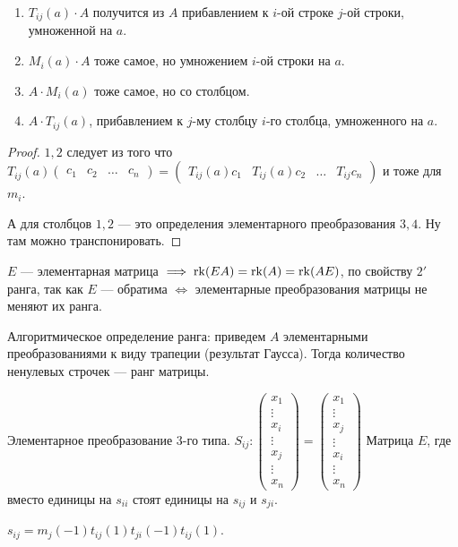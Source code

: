 \begin{statement}
    \begin{enumerate}
        \item $T_{ij}(a) \cdot A$ получится из  $A$ прибавлением к  $i$-ой строке  $j$-ой строки, умноженной на  $a$.
        \item $M_i(a)\cdot A$ тоже самое, но умножением  $i$-ой строки на  $a$.
        \item  $A \cdot M_i(a)$ тоже самое, но со столбцом.
        \item  $A \cdot T_{ij}(a)$, прибавлением к  $j$-му столбцу  $i$-го столбца, умноженного на  $a$.
    \end{enumerate}
\end{statement}
\begin{proof}
$1, 2$ следует из того что  $T_{ij}(a) \left(\begin{array}{c|c|c|c} c_1 & c_2 & \ldots & c_n \end{array} \right) = \left(\begin{array}{c|c|c|c} T_{ij}(a)c_1 & T_{ij}(a)c_2 & \ldots & T_{ij}c_n \end{array} \right)$ и тоже для $m_i$.

А для столбцов  $1,2$ --- это определения элементарного преобразования  $3, 4$. Ну там можно транспонировать. 
\end{proof}
\begin{remark}
    $E$ --- элементарная матрица  $\implies \operatorname{rk}(EA) = \operatorname{rk}(A) = \operatorname{rk}(AE)$, по свойству  $2'$ ранга, так как  $E$ --- обратима  $\iff$ элементарные преобразования матрицы не меняют их ранга.
\end{remark}
\begin{consequence}
    Алгоритмическое определение ранга: приведем $A$ элементарными преобразованиями к виду трапеции (результат Гаусса). Тогда количество ненулевых строчек --- ранг матрицы.
\end{consequence}
\begin{remark}
    Элементарное преобразование 3-го типа.
    $S_{ij}\!: \begin{pmatrix} x_1 \\ \vdots \\ x_i \\ \vdots \\ x_j \\ \vdots \\x_n \end{pmatrix} = \begin{pmatrix} x_1 \\ \vdots \\ x_j \\ \vdots \\ x_i \\ \vdots \\x_n \end{pmatrix}$
    Матрица $E$, где вместо единицы на  $s_{ii}$ стоят единицы на  $s_{ij}$ и  $s_{ji}$.

    $s_{ij} = m_{j}(-1)t_{ij}(1)t_{ji}(-1)t_{ij}(1)$.
\end{remark}
